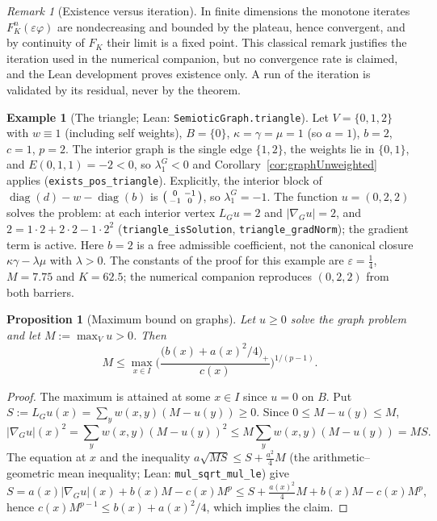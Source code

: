 \documentclass[11pt]{article}
\theoremstyle{plain}
\newtheorem{proposition}[theorem]{Proposition}
\theoremstyle{definition}
\newtheorem{example}[theorem]{Example}
\theoremstyle{remark}
\newtheorem{remark}[theorem]{Remark}
\begin{document}
\begin{remark}[Existence versus iteration]\label{rem:graphIteration}
In finite dimensions the monotone iterates \(F_K^n(\varepsilon\varphi)\) are nondecreasing and bounded by the plateau, hence convergent, and by continuity of \(F_K\) their limit is a fixed point. This classical remark justifies the iteration used in the numerical companion, but no convergence rate is claimed, and the Lean development proves existence only. A run of the iteration is validated by its residual, never by the theorem.
\end{remark}

\begin{example}[The triangle; Lean: \texttt{SemioticGraph.triangle}]\label{ex:triangle}
Let \(V=\{0,1,2\}\) with \(w\equiv 1\) (including self weights), \(B=\{0\}\), \(\kappa=\gamma=\mu=1\) (so \(a=1\)), \(b=2\), \(c=1\), \(p=2\). The interior graph is the single edge \(\{1,2\}\), the weights lie in \(\{0,1\}\), and \(E(0,1,1)=-2<0\), so \(\lambda_1^G<0\) and Corollary~\ref{cor:graphUnweighted} applies (\texttt{exists\_pos\_triangle}). Explicitly, the interior block of \(\operatorname{diag}(d)-w-\operatorname{diag}(b)\) is \(\begin{psmallmatrix}0&-1\\-1&0\end{psmallmatrix}\), so \(\lambda_1^G=-1\). The function \(u=(0,2,2)\) solves the problem: at each interior vertex \(L_Gu=2\) and \(|\nabla_Gu|=2\), and \(2=1\cdot 2+2\cdot 2-1\cdot 2^2\) (\texttt{triangle\_isSolution}, \texttt{triangle\_gradNorm}); the gradient term is active. Here \(b=2\) is a free admissible coefficient, not the canonical closure \(\kappa\gamma-\lambda\mu\) with \(\lambda>0\). The constants of the proof for this example are \(\varepsilon=\tfrac14\), \(M=7.75\) and \(K=62.5\); the numerical companion reproduces \((0,2,2)\) from both barriers.
\end{example}

\begin{proposition}[Maximum bound on graphs]\label{prop:graphBound}
Let \(u\ge 0\) solve the graph problem and let \(M:=\max_Vu>0\). Then
\[
M\le\max_{x\in I}\Big(\frac{\big(b(x)+a(x)^2/4\big)_+}{c(x)}\Big)^{1/(p-1)} .
\]
\end{proposition}
\begin{proof}
The maximum is attained at some \(x\in I\) since \(u=0\) on \(B\). Put \(S:=L_Gu(x)=\sum_yw(x,y)(M-u(y))\ge 0\). Since \(0\le M-u(y)\le M\),
\[
|\nabla_Gu|(x)^2=\sum_yw(x,y)(M-u(y))^2\le M\sum_yw(x,y)(M-u(y))=MS .
\]
The equation at \(x\) and the inequality \(a\sqrt{MS}\le S+\tfrac{a^2}{4}M\) (the arithmetic--geometric mean inequality; Lean: \texttt{mul\_sqrt\_mul\_le}) give
\[
S=a(x)|\nabla_Gu|(x)+b(x)M-c(x)M^p\le S+\tfrac{a(x)^2}{4}M+b(x)M-c(x)M^p,
\]
hence \(c(x)M^{p-1}\le b(x)+a(x)^2/4\), which implies the claim.
\end{proof}
\end{document}
